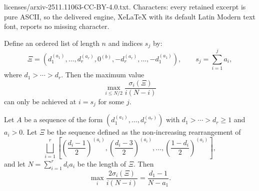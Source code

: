\documentclass[10pt,a4paper]{amsart}
\newcommand{\f}{\frac}
\newcommand{\lf}{\left}
\newcommand{\ri}{\right}
\begin{document}
licenses/arxiv-2511.11063-CC-BY-4.0.txt. Characters: every retained excerpt is pure ASCII, so the delivered engine, XeLaTeX with its default Latin Modern text font, reports no missing character.
\begin{lem}\label{lem:indexofmaximum1}
Define an ordered list of length $n$ and indices $s_j$ by:
\[
\Xi = (d_1^{(a_1)}, \dotsc, d_r^{(a_r)}, 0^{(b)}, -d_r^{(a_r)}, \dotsc, -d_1^{(a_1)}), 
\qquad s_j = \sum_{i=1}^j a_i,
\]
where $d_1 > \cdots > d_r$. Then the maximum value 
\[ 
\max_{i \le N/2} \f{\sigma_i(\Xi)}{i(N-i)} 
\] 
can only be achieved at $i=s_j$ for some $j$.
\end{lem}

\begin{lem}\label{lem:indexofmaximum2}

Let $A$ be a sequence of the form $(d_1^{(a_1)}, \dotsc, d_r^{(a_r)})$ with $d_1 > \cdots > d_r \geq 1$ and $a_i > 0$.  Let $\Xi$ be the sequence defined as the non-increasing rearrangement of
\[
\bigsqcup_{i=1}^r \lf[ \left( \f{d_i-1}2 \right)^{(a_i)}, \left( \f{d_i-3}2 \right)^{(a_i)}, \dotsc, \left( \f{1-d_i}2 \right)^{(a_i)} \ri],
\]
and let $N = \sum_{i=1}^r d_i a_i$ be the length of $\Xi$.  Then
\[
\max_i \f{2\sigma_i(\Xi)}{i(N-i)} = \frac{d_1 - 1}{N - a_1}.
\]

\end{lem}
\end{document}
